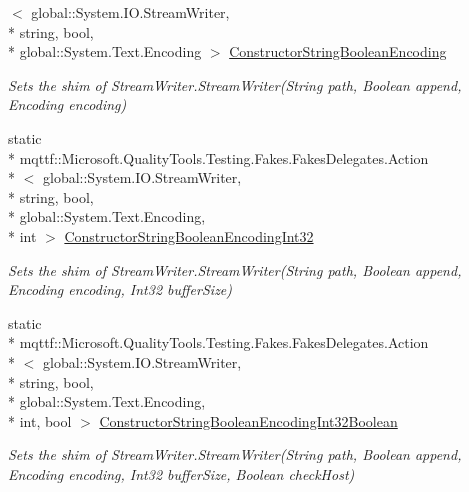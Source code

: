 \begin{DoxyCompactItemize}
$<$ global\-::\-System.\-I\-O.\-Stream\-Writer, \\*
string, bool, \\*
global\-::\-System.\-Text.\-Encoding $>$ \hyperlink{class_system_1_1_i_o_1_1_fakes_1_1_shim_stream_writer_a4114f0981420cfdc98d654883685eabf}{Constructor\-String\-Boolean\-Encoding}
\begin{DoxyCompactList}\small\item\em Sets the shim of Stream\-Writer.\-Stream\-Writer(\-String path, Boolean append, Encoding encoding)\end{DoxyCompactList}\item 
static \\*
mqttf\-::\-Microsoft.\-Quality\-Tools.\-Testing.\-Fakes.\-Fakes\-Delegates.\-Action\\*
$<$ global\-::\-System.\-I\-O.\-Stream\-Writer, \\*
string, bool, \\*
global\-::\-System.\-Text.\-Encoding, \\*
int $>$ \hyperlink{class_system_1_1_i_o_1_1_fakes_1_1_shim_stream_writer_a9d4ccb76fed81b8feeb5ff8c869ce124}{Constructor\-String\-Boolean\-Encoding\-Int32}
\begin{DoxyCompactList}\small\item\em Sets the shim of Stream\-Writer.\-Stream\-Writer(\-String path, Boolean append, Encoding encoding, Int32 buffer\-Size)\end{DoxyCompactList}\item 
static \\*
mqttf\-::\-Microsoft.\-Quality\-Tools.\-Testing.\-Fakes.\-Fakes\-Delegates.\-Action\\*
$<$ global\-::\-System.\-I\-O.\-Stream\-Writer, \\*
string, bool, \\*
global\-::\-System.\-Text.\-Encoding, \\*
int, bool $>$ \hyperlink{class_system_1_1_i_o_1_1_fakes_1_1_shim_stream_writer_ab969956e36855f505e9a102e20a0c051}{Constructor\-String\-Boolean\-Encoding\-Int32\-Boolean}
\begin{DoxyCompactList}\small\item\em Sets the shim of Stream\-Writer.\-Stream\-Writer(\-String path, Boolean append, Encoding encoding, Int32 buffer\-Size, Boolean check\-Host)\end{DoxyCompactList}\item 

\end{DoxyCompactItemize}
